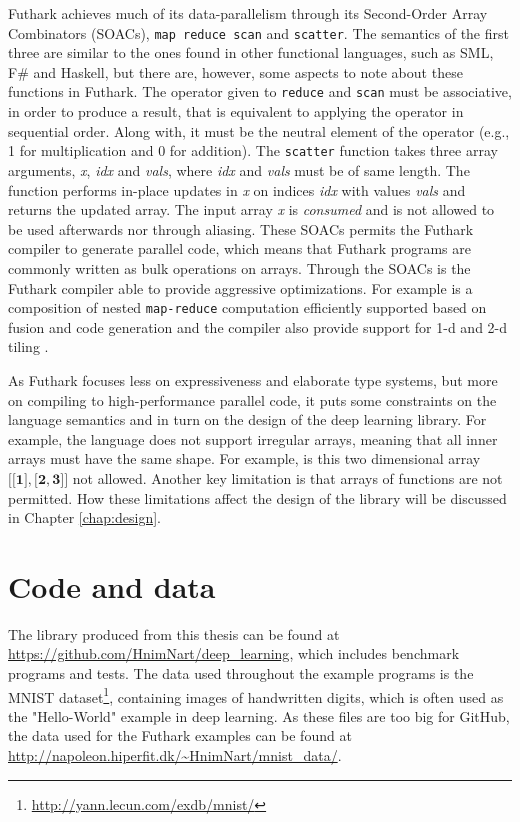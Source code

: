 Futhark achieves much of its data-parallelism through its Second-Order Array
Combinators (SOACs), \texttt{map reduce scan} and \texttt{scatter}. 
The semantics of the first three are similar to the ones found in other
functional languages, such as SML, F\# and Haskell, but there are, however, some
aspects to note about these functions in Futhark. 
The operator given to \texttt{reduce} and \texttt{scan} must be associative, in
order to produce a result, that is equivalent to applying the operator in
sequential order. 
Along with, it must be the neutral element of the operator (e.g., 1 for
multiplication and 0 for addition). 
The \texttt{scatter} function takes three array arguments, \emph{x}, \emph{idx}
and \emph{vals}, where \emph{idx} and \emph{vals} must be of same length. 
The function performs in-place updates in \emph{x} on indices \emph{idx} with
values \emph{vals} and returns the updated array. 
The input array \emph{x} is \emph{consumed} and is not allowed to be used
afterwards nor through aliasing. 
These SOACs permits the Futhark compiler to generate parallel code, which means
that Futhark programs are commonly written as bulk operations on arrays. 
Through the SOACs is the Futhark compiler able to provide aggressive
optimizations. 
For example is a composition of nested \texttt{map-reduce} computation
efficiently supported based on fusion and code generation
\cite{Henriksen:2016:DGP:2935323.2935326, Larsen:2017:SRS:3122948.3122952} and
the compiler also provide support for 1-d and 2-d tiling
\cite{Henriksen:2017:FPF:3140587.3062354}.  

As Futhark focuses less on expressiveness and elaborate type systems, but more
on compiling to high-performance parallel code, it puts some constraints on the
language semantics and in turn on the design of the deep learning library. 
For example, the language does not support irregular arrays, meaning that all
inner arrays must have the same shape. 
For example, is this two dimensional array $\boldsymbol{\lbrack \lbrack
	1\rbrack, \lbrack 2,3\rbrack \rbrack}$ not allowed. 
Another key limitation is that arrays of functions are not permitted. How these
limitations affect the design of the library will be discussed in Chapter
\ref{chap:design}. 

\section{Code and data}
The library produced from this thesis can be found at
\url{https://github.com/HnimNart/deep_learning}, which includes benchmark
programs and tests. 
The data used throughout the example programs is the MNIST
dataset\footnote{\url{http://yann.lecun.com/exdb/mnist/}}, containing images of
handwritten digits, which is often used as the "Hello-World" example in deep
learning. 
As these files are too big for GitHub, the data used for the Futhark examples
can be found at \url{http://napoleon.hiperfit.dk/~HnimNart/mnist_data/}. 


